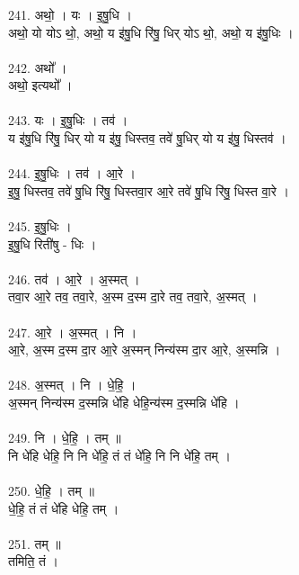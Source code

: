 \subsubsection{}
241. अथो॒ । यः । इ॒षु॒धि ।\\
अथो॒ यो योऽ थो॒, अथो॒ य इ॑षु॒धि रि॑षु॒ धिर् योऽ थो॒, अथो॒ य इ॑षु॒धिः ।\\
\\
242. अथो᳚ ।\\
अथो॒ इत्यथो᳚ ।\\
\\
243. यः । इ॒षु॒धिः । तव॑ ।\\
य इ॑षु॒धि रि॑षु॒ धिर् यो य इ॑षु॒ धिस्तव॒ तवे॑ षु॒धिर् यो य इ॑षु॒ धिस्तव॑ ।\\
\\
244. इ॒षु॒धिः । तव॑ । आ॒रे ।\\
इ॒षु॒ धिस्तव॒ तवे॑ षु॒धि रि॑षु॒ धिस्तवा॒र आ॒रे तवे॑ षु॒धि रि॑षु॒ धिस्त वा॒रे ।\\
\\
245. इ॒षु॒धिः ।\\
इ॒षु॒धि रिती॑षु - धिः ।\\
\\
246. तव॑ । आ॒रे । अ॒स्मत् ।\\
तवा॒र आ॒रे तव॒ तवा॒रे, अ॒स्म द॒स्म दा॒रे तव॒ तवा॒रे, अ॒स्मत् ।\\
\\
247. आ॒रे । अ॒स्मत् । नि ।\\
आ॒रे, अ॒स्म द॒स्म दा॒र आ॒रे अ॒स्मन् निन्य॑स्म दा॒र आ॒रे, अ॒स्मन्नि ।\\
\\
248. अ॒स्मत् । नि । धे॒हि॒ ।\\
अ॒स्मन् निन्य॑स्म द॒स्मन्नि धे॑हि धेहि॒न्य॑स्म द॒स्मन्नि धे॑हि ।\\
\\
249. नि । धे॒हि॒ । तम् ॥\\
नि धे॑हि धेहि॒ नि नि धे॑हि॒ तं तं धे॑हि॒ नि नि धे॑हि॒ तम् ।\\
\\
250. धे॒हि॒ । तम् ॥\\
धे॒हि॒ तं तं धे॑हि धेहि॒ तम् ।\\
\\
251. तम् ॥\\
तमिति॒ तं ।\\
